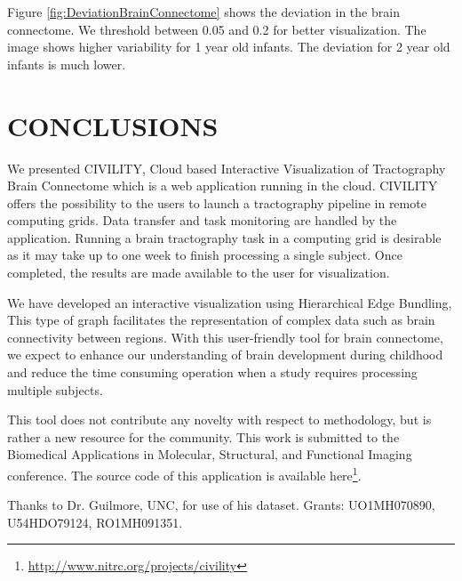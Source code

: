 \documentclass[]{spie}  %
\begin{document}
Figure \ref{fig:DeviationBrainConnectome} shows the deviation in the brain connectome. 
We threshold between 0.05 and 0.2 for better visualization. The image shows higher variability for 1 year old infants. The deviation for 2 year old infants is much lower. 

\section{CONCLUSIONS} 

We presented CIVILITY, Cloud based Interactive Visualization of Tractography Brain Connectome which is a web application running in the cloud. 
CIVILITY offers the possibility to the users to launch a tractography pipeline in remote computing grids. 
Data transfer and task monitoring are handled by the application. 
Running a brain tractography task in a computing grid is desirable 
as it may take up to one week to finish processing a single subject. 
Once completed, the results are made available to the user for visualization. 

We have developed an interactive visualization using Hierarchical Edge Bundling,
This type of graph facilitates the representation of complex data such as brain connectivity between regions. 
With this user-friendly tool for brain connectome, we expect to 
enhance our understanding of brain development during childhood and reduce the time consuming 
operation when a study requires processing multiple subjects. 

This tool does not contribute any novelty with respect to methodology, 
but is rather a new resource for the community. This work is submitted to the Biomedical Applications in Molecular, Structural, and Functional Imaging conference. The source code of this application is available here\footnote{\url{http://www.nitrc.org/projects/civility}}.


\acknowledgments

Thanks to Dr. Guilmore, UNC, for use of his dataset. Grants: UO1MH070890, U54HDO79124, RO1MH091351. 


\end{document}
